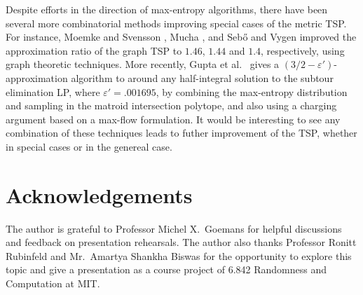 \documentclass[letterpaper, reqno,12pt]{article}
\begin{document}
Despite efforts in the direction of max-entropy algorithms, there have been several more combinatorial methods improving special cases of the metric TSP. For instance, Moemke and Svensson \cite{momke2011approximating}, Mucha \cite{mucha2014frac}, and Seb\H{o} and Vygen \cite{ sebHo2014shorter} improved the approximation ratio of the graph TSP to $1.46$, $1.44$ and $1.4$, respectively, using graph theoretic techniques. More recently, Gupta et al.\ \cite{gupta2021matroid} gives a $(3/2 - \varepsilon')$-approximation algorithm to around any half-integral solution to the subtour elimination LP, where $\varepsilon' = .001695$, by combining the max-entropy distribution and sampling in the matroid intersection polytope, and also using a charging argument based on a max-flow formulation. It would be interesting to see any combination of these techniques leads to futher improvement of the TSP, whether in special cases or in the genereal case.

\section*{Acknowledgements}

The author is grateful to Professor Michel X.\ Goemans for helpful discussions and feedback on presentation rehearsals. The author also thanks Professor Ronitt Rubinfeld and Mr.\ Amartya Shankha Biswas for the opportunity to explore this topic and give a presentation as a course project of 6.842 Randomness and Computation at MIT.



\end{document}
